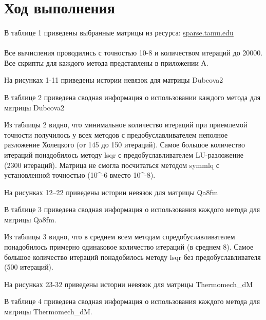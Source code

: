 \section*{Ход выполнения}

\paragraph{}
В таблице 1 приведены выбранные матрицы из ресурса: \href{https://sparse.tamu.edu/}{sparse.tamu.edu}\\

\\

Все вычисления проводились с точностью 10-8 и количеством итераций до 20000. Все скрипты для каждого метода представлены в приложении А.

На рисунках 1-11 приведены истории невязок для матрицы Dubcova2



В таблице 2 приведена сводная информация о использовании каждого метода для матрицы Dubcova2




Из таблицы 2 видно, что минимальное количество итераций при приемлемой точности получилось
у всех методов с предобуславливателем неполное разложение Холецкого (от 145 до 150 итераций).
Самое большое количество итераций понадобилось методу lsqr с предобуславливателем LU-разложение (2300 итераций).
Матрица не смогла посчитаться методом symmlq с установленной точностью (10^{-6}  вместо 10^{-8}).

На рисунках 12--22 приведены истории невязок для матрицы Qa8fm



В таблице 3 приведена сводная информация о использования каждого метода для матрицы Qa8fm.



Из таблицы 3 видно, что в среднем всем методам спредобуславливателем понадобилось примерно одинаковое количество
итераций (в среднем 8).
Самое большое количество итераций понадобилось методу lsqr без предобуславливателя (500 итераций).

На рисунках 23-32 приведены истории невязок для матрицы Thermomech_dM



В таблице 4 приведена сводная информация о использования каждого метода для матрицы Thermomech_dM.

